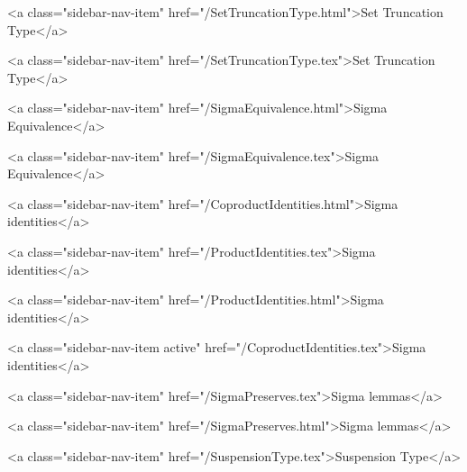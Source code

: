      
        
          <a class="sidebar-nav-item" href="/SetTruncationType.html">Set Truncation Type</a>
        
      
    
      
        
          <a class="sidebar-nav-item" href="/SetTruncationType.tex">Set Truncation Type</a>
        
      
    
      
        
          <a class="sidebar-nav-item" href="/SigmaEquivalence.html">Sigma Equivalence</a>
        
      
    
      
        
          <a class="sidebar-nav-item" href="/SigmaEquivalence.tex">Sigma Equivalence</a>
        
      
    
      
        
          <a class="sidebar-nav-item" href="/CoproductIdentities.html">Sigma identities</a>
        
      
    
      
        
          <a class="sidebar-nav-item" href="/ProductIdentities.tex">Sigma identities</a>
        
      
    
      
        
          <a class="sidebar-nav-item" href="/ProductIdentities.html">Sigma identities</a>
        
      
    
      
        
          <a class="sidebar-nav-item active" href="/CoproductIdentities.tex">Sigma identities</a>
        
      
    
      
        
          <a class="sidebar-nav-item" href="/SigmaPreserves.tex">Sigma lemmas</a>
        
      
    
      
        
          <a class="sidebar-nav-item" href="/SigmaPreserves.html">Sigma lemmas</a>
        
      
    
      
        
          <a class="sidebar-nav-item" href="/SuspensionType.tex">Suspension Type</a>
        
